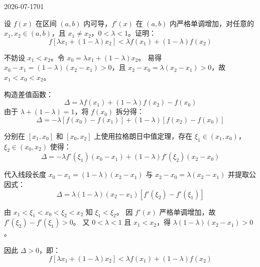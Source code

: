 \begin{mistake}{2026-07-17}{01}

\begin{problemcontent}
设 \(f(x)\) 在区间 \((a,b)\) 内可导，\(f'(x)\) 在 \((a,b)\) 内严格单调增加，对任意的 \(x_1, x_2 \in (a,b)\)，且 \(x_1 \neq x_2\)，\(0 < \lambda < 1\)。证明：
\[ f[\lambda x_1 + (1-\lambda)x_2] < \lambda f(x_1) + (1-\lambda)f(x_2) \]
\end{problemcontent}

\begin{solutioncontent}
不妨设 \(x_1 < x_2\)。令 \(x_0 = \lambda x_1 + (1-\lambda)x_2\)。
易得 \(x_0 - x_1 = (1-\lambda)(x_2 - x_1) > 0\)，且 \(x_2 - x_0 = \lambda(x_2 - x_1) > 0\)，故 \(x_1 < x_0 < x_2\)。

构造差值函数：
\[ \Delta = \lambda f(x_1) + (1-\lambda)f(x_2) - f(x_0) \]
由于 \(\lambda + (1-\lambda) = 1\)，将 \(f(x_0)\) 拆分得：
\[ \Delta = -\lambda [f(x_0) - f(x_1)] + (1-\lambda) [f(x_2) - f(x_0)] \]

分别在 \([x_1, x_0]\) 和 \([x_0, x_2]\) 上使用拉格朗日中值定理，存在 \(\xi_1 \in (x_1, x_0)\)，\(\xi_2 \in (x_0, x_2)\) 使得：
\[ \Delta = -\lambda f'(\xi_1)(x_0 - x_1) + (1-\lambda) f'(\xi_2)(x_2 - x_0) \]

代入线段长度 \(x_0 - x_1 = (1-\lambda)(x_2 - x_1)\) 与 \(x_2 - x_0 = \lambda(x_2 - x_1)\) 并提取公因式：
\[ \Delta = \lambda(1-\lambda)(x_2 - x_1) [f'(\xi_2) - f'(\xi_1)] \]

由 \(x_1 < \xi_1 < x_0 < \xi_2 < x_2\) 知 \(\xi_1 < \xi_2\)。
因 \(f'(x)\) 严格单调增加，故 \(f'(\xi_2) - f'(\xi_1) > 0\)。
又 \(0 < \lambda < 1\) 且 \(x_1 < x_2\)，得 \(\lambda(1-\lambda)(x_2 - x_1) > 0\)。

因此 \(\Delta > 0\)，即：
\[ f[\lambda x_1 + (1-\lambda)x_2] < \lambda f(x_1) + (1-\lambda)f(x_2) \]
\end{solutioncontent}


\end{mistake}

